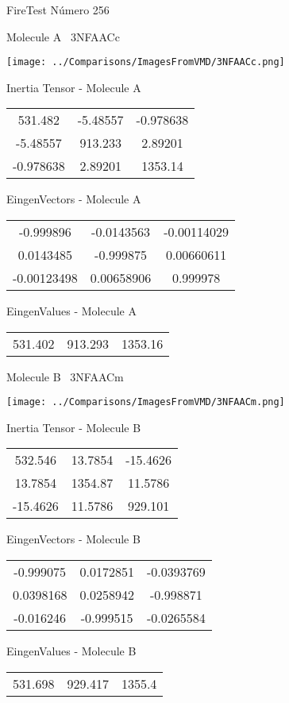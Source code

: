 \vtab[-3cm]
\begin{center}
{\large FireTest \tab Número 256}
\end{center}
\begin{multicols}{2}
\begin{center}

Molecule A \
3NFAACc

\texttt{[image: ../Comparisons/ImagesFromVMD/3NFAACc.png]}

Inertia Tensor - Molecule A \\
\begin{tabular}{|c c c|}
531.482	 & 	-5.48557	 & 	-0.978638	 \\
-5.48557	 & 	913.233	 & 	2.89201	 \\
-0.978638	 & 	2.89201	 & 	1353.14
\end{tabular}

\vtab
 EingenVectors - Molecule A     \\
\begin{tabular}{|c c c|}
-0.999896	 & 	-0.0143563	 & 	-0.00114029	 \\
0.0143485	 & 	-0.999875	 & 	0.00660611	 \\
-0.00123498	 & 	0.00658906	 & 	0.999978
\end{tabular}

\vtab
 EingenValues - Molecule A     \\
\begin{tabular}{|c c c|}
531.402	 & 	913.293	 & 	1353.16	 \\
\end{tabular}
\columnbreak

Molecule B \
3NFAACm

\texttt{[image: ../Comparisons/ImagesFromVMD/3NFAACm.png]}

Inertia Tensor - Molecule B \\
\begin{tabular}{|c c c|}
532.546	 & 	13.7854	 & 	-15.4626	 \\
13.7854	 & 	1354.87	 & 	11.5786	 \\
-15.4626	 & 	11.5786	 & 	929.101
\end{tabular}

\vtab
 EingenVectors - Molecule B     \\
\begin{tabular}{|c c c|}
-0.999075	 & 	0.0172851	 & 	-0.0393769	 \\
0.0398168	 & 	0.0258942	 & 	-0.998871	 \\
-0.016246	 & 	-0.999515	 & 	-0.0265584
\end{tabular}

\vtab
 EingenValues - Molecule B     \\
\begin{tabular}{|c c c|}
531.698	 & 	929.417	 & 	1355.4	 \\
\end{tabular}

\end{center}
\end{multicols}

